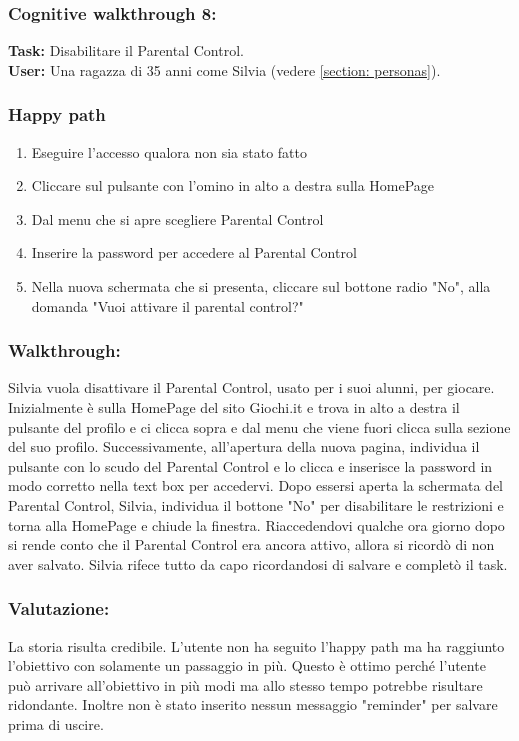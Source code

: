\documentclass[../Report.tex]{subfiles}
\begin{document}
    \subsubsection{Cognitive walkthrough 8:}
    \textbf{Task:} Disabilitare il Parental Control.\\
    \textbf{User:} Una ragazza di 35 anni come Silvia (vedere \ref{section: personas}).\\

    \subsubsection{Happy path}
    \begin{enumerate}
        \item Eseguire l'accesso qualora non sia stato fatto 
        \item Cliccare sul pulsante con l’omino in alto a destra sulla HomePage
        \item Dal menu che si apre scegliere Parental Control
        \item Inserire la password per accedere al Parental Control 
        \item Nella nuova schermata che si presenta, cliccare sul bottone radio "No", alla domanda "Vuoi attivare il parental control?"
    \end{enumerate}

    \subsubsection{Walkthrough:}
    Silvia vuola disattivare il Parental Control, usato per i suoi alunni, per giocare. Inizialmente è sulla HomePage del sito Giochi.it e  trova in alto a destra il pulsante del profilo e ci clicca sopra e dal menu che viene fuori clicca sulla sezione del suo profilo. Successivamente, all'apertura della nuova pagina, individua il pulsante con lo scudo del Parental Control e lo clicca e inserisce la password in modo corretto nella text box per accedervi. Dopo essersi aperta la schermata del Parental Control, Silvia, individua il bottone "No" per disabilitare le restrizioni e torna alla HomePage e chiude la finestra. Riaccedendovi qualche ora giorno dopo si rende conto che il Parental Control era ancora attivo, allora si ricordò di non aver salvato. Silvia rifece tutto da capo ricordandosi di salvare e completò il task.  
    \subsubsection{Valutazione:}
    La storia risulta credibile. L'utente non ha seguito l'happy path ma ha raggiunto l'obiettivo con solamente un passaggio in più. Questo è ottimo perché l'utente può arrivare all'obiettivo in più modi ma allo stesso tempo potrebbe risultare ridondante. Inoltre non è stato inserito nessun messaggio "reminder" per salvare prima di uscire.
\end{document}
